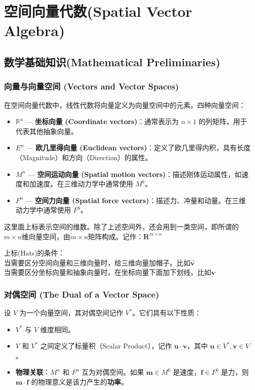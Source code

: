 \chapter{空间向量代数(Spatial Vector Algebra)}
\section{数学基础知识(Mathematical Preliminaries)}
\subsection{向量与向量空间 (Vectors and Vector Spaces)}

在空间向量代数中，线性代数将向量定义为向量空间中的元素。四种向量空间：

\begin{itemize}
    \item $\mathbb{R}^n$ --- \textbf{坐标向量 (Coordinate vectors)}：通常表示为 $n \times 1$ 的列矩阵，用于代表其他抽象向量。
    \item $E^n$ --- \textbf{欧几里得向量 (Euclidean vectors)}：定义了欧几里得内积，具有长度（Magnitude）和方向（Direction）的属性。
    \item $M^n$ --- \textbf{空间运动向量 (Spatial motion vectors)}：描述刚体运动属性，如速度和加速度。在三维动力学中通常使用 $M^6$。
    \item $F^n$ --- \textbf{空间力向量 (Spatial force vectors)}：描述力、冲量和动量。在三维动力学中通常使用 $F^6$。
\end{itemize}
这里面上标表示空间的维数。除了上述空间外，还会用到一类空间，即所谓的$m \times n$维向量空间，由$m \times n$矩阵构成。记作：$\mathbf{R}^{m \times n}$
\begin{tcolorbox}[colback=blue!6, title=上下标注意]
上标(Hats)的条件：\\当需要区分空间向量和三维向量时，给三维向量加帽子。比如\textbf{$\hat{\bm{v}}$}\\当需要区分坐标向量和抽象向量时，在坐标向量下面加下划线，比如$\underline{\bm{v}}$
\end{tcolorbox}

\subsection{对偶空间 (The Dual of a Vector Space)}

设 $V$ 为一个向量空间，其对偶空间记作 $V^*$。它们具有以下性质：
\begin{itemize}
    \item $V^*$ 与 $V$ 维度相同。
    \item $V$ 和 $V^*$ 之间定义了标量积（Scalar Product），记作 $\boldsymbol{u} \cdot \boldsymbol{v}$，其中 $\boldsymbol{u} \in V^*, \boldsymbol{v} \in V$。
    \item \textbf{物理关联}：$M^n$ 和 $F^n$ 互为对偶空间。如果 $\boldsymbol{m} \in M^6$ 是速度，$\boldsymbol{f} \in F^6$ 是力，则 $\boldsymbol{m} \cdot \boldsymbol{f}$ 的物理意义是该力产生的\textbf{功率}。
\end{itemize}


